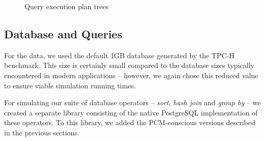 \begin{figure*}[htpb]
{

}

\caption{ Query execution plan trees}

\label{fig:plan_trees}

\end{figure*}


\subsection{Database and Queries}
For the data, we used the default 1GB database generated by the TPC-H
benchmark.  This size is certainly small compared to the database sizes
typically encountered in modern applications -- however, we again chose
this reduced value to ensure viable simulation running times.

\begin{comment}
Notwithstanding, to ensure that our results were not skewed 
as an outcome,  we used scaled down versions of the hardware simulation parameters
from \cite{wear}, taking care to preserve the size ratios between adjacent
memory devices.
\end{comment}

For simulating our suite of database operators -- \textit{sort},
\textit{hash join} and \textit{group by} -- we created a separate library
consisting of the native PostgreSQL implementation of these operators. To
this library, we added the PCM-conscious versions described in the
previous sections.

